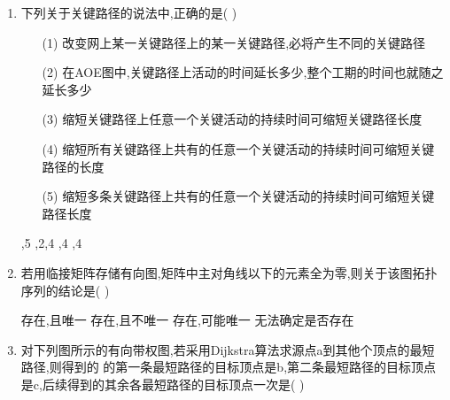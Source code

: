 \documentclass[12pt, a4paper, oneside, UTF8]{ctexbook}
\begin{document}
\begin{enumerate}
    \item 下列关于关键路径的说法中,正确的是(   ) 
    \begin{enumerate}
        \item [(1)]改变网上某一关键路径上的某一关键路径,必将产生不同的关键路径
        \item [(2)]在AOE图中,关键路径上活动的时间延长多少,整个工期的时间也就随之延长多少
        \item [(3)]缩短关键路径上任意一个关键活动的持续时间可缩短关键路径长度
        \item [(4)]缩短所有关键路径上共有的任意一个关键活动的持续时间可缩短关键路径的长度
        \item [(5)]缩短多条关键路径上共有的任意一个关键活动的持续时间可缩短关键路径长度 
    \end{enumerate}
    \begin{choices}
        ,5
        ,2,4
        ,4
        ,4
    \end{choices}

    \item \bl 若用临接矩阵存储有向图,矩阵中主对角线以下的元素全为零,则关于该图拓扑序列的结论是(   )
    \begin{choices}[2]
        \task 存在,且唯一
        \task 存在,且不唯一
        \task 存在,可能唯一
        \task 无法确定是否存在
    \end{choices}

    \item \bl 对下列图所示的有向带权图,若采用Dijkstra算法求源点a到其他个顶点的最短路径,则得到的
    的第一条最短路径的目标顶点是b,第二条最短路径的目标顶点是c,后续得到的其余各最短路径的目标顶点一次是(   )
    \begin{center}
\end{center}
\end{enumerate}
\end{document}
